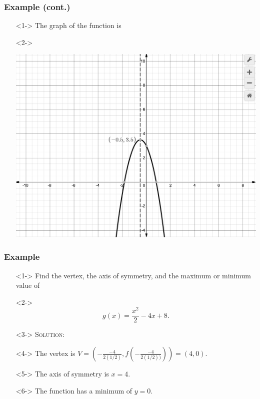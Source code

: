 \documentclass[handout]{beamer}
\begin{document}
\begin{frame}
	\frametitle{Example (cont.)}
	\begin{enumerate}
		\item[]<1-> The graph of the function is
		\item[]<2->\begin{center}
				\includegraphics[scale=0.25]{3_3_3.png}
			\end{center}
	\end{enumerate}
\end{frame}

\begin{frame}
	\frametitle{Example}
	\begin{enumerate}
		\item[]<1-> Find the vertex, the axis of symmetry, and the maximum or minimum value of
		\item[]<2->\[ g(x)=\frac{x^{2}}{2}-4x+8. \]
		\item[]<3-> \textsc{Solution:}
		\item[]<4-> The vertex is $V=\left( -\frac{-4}{2(1/2)}, f \left( -\frac{-4}{2(1/2))} \right)\right)=\left( 4, 0 \right)$.
		\item[]<5-> The axis of symmetry is $x=4$.
		\item[]<6-> The function has a minimum of $y=0$.
	\end{enumerate}
\end{frame}
\end{document}
